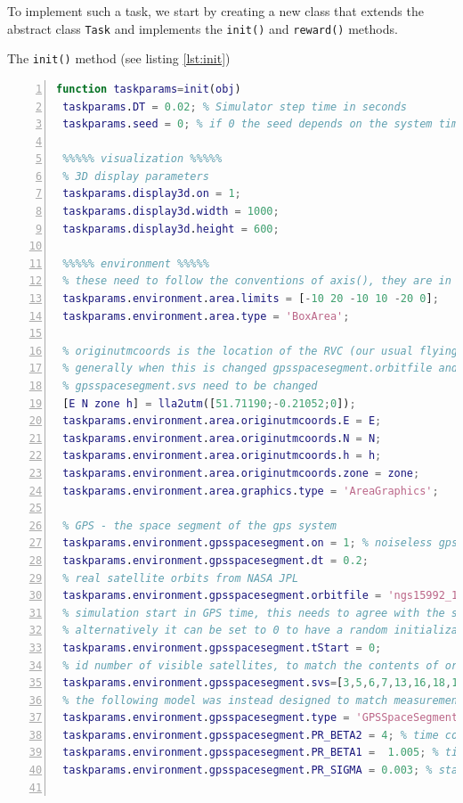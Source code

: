 \documentclass[a4paper,11pt]{report}
\begin{document}
To implement such a task, we start by creating a new class that extends the abstract class \texttt{Task} and implements the \texttt{init()} and \texttt{reward()} methods.

The \texttt{init()} method (see listing \ref{lst:init}) 
\begin{lstlisting}[float=ht!bp,caption=TaskKeepSpot init() method,language=Matlab,frame=lines,label=lst:init,numbers=left,basicstyle=\small]
function taskparams=init(obj)  
 taskparams.DT = 0.02; % Simulator step time in seconds            
 taskparams.seed = 0; % if 0 the seed depends on the system time
            
 %%%%% visualization %%%%%
 % 3D display parameters
 taskparams.display3d.on = 1;
 taskparams.display3d.width = 1000;
 taskparams.display3d.height = 600;            
            
 %%%%% environment %%%%%
 % these need to follow the conventions of axis(), they are in m, Z down
 taskparams.environment.area.limits = [-10 20 -10 10 -20 0];
 taskparams.environment.area.type = 'BoxArea';
            
 % originutmcoords is the location of the RVC (our usual flying site)
 % generally when this is changed gpsspacesegment.orbitfile and 
 % gpsspacesegment.svs need to be changed
 [E N zone h] = lla2utm([51.71190;-0.21052;0]);
 taskparams.environment.area.originutmcoords.E = E;
 taskparams.environment.area.originutmcoords.N = N;
 taskparams.environment.area.originutmcoords.h = h;
 taskparams.environment.area.originutmcoords.zone = zone;
 taskparams.environment.area.graphics.type = 'AreaGraphics';
            
 % GPS - the space segment of the gps system
 taskparams.environment.gpsspacesegment.on = 1; % noiseless gps if 0
 taskparams.environment.gpsspacesegment.dt = 0.2;
 % real satellite orbits from NASA JPL
 taskparams.environment.gpsspacesegment.orbitfile = 'ngs15992_16to17.sp3';
 % simulation start in GPS time, this needs to agree with the sp3 file above, 
 % alternatively it can be set to 0 to have a random initialization 
 taskparams.environment.gpsspacesegment.tStart = 0;             
 % id number of visible satellites, to match the contents of orbitfile
 taskparams.environment.gpsspacesegment.svs=[3,5,6,7,13,16,18,19,20,22,24,29,31];
 % the following model was instead designed to match measurements of real data
 taskparams.environment.gpsspacesegment.type = 'GPSSpaceSegmentGM2';            
 taskparams.environment.gpsspacesegment.PR_BETA2 = 4; % time constant
 taskparams.environment.gpsspacesegment.PR_BETA1 =  1.005; % time constant   
 taskparams.environment.gpsspacesegment.PR_SIGMA = 0.003; % standard deviation            
            

\end{lstlisting}
\end{document}
